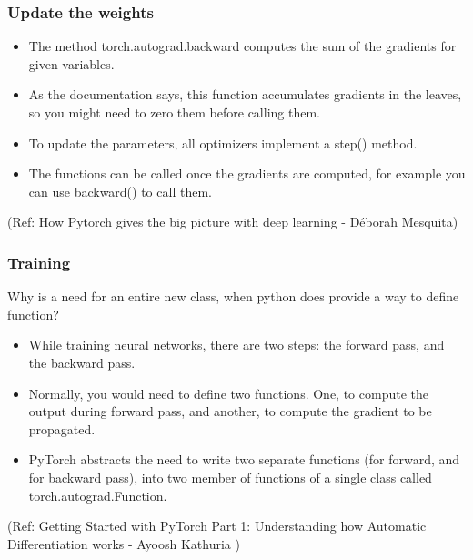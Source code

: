 \begin{frame}[fragile] \frametitle{Update the weights}
\begin{itemize}
\item The method torch.autograd.backward computes the sum of the gradients for given variables. 
\item As the documentation says, this function accumulates gradients in the leaves, so you might need to zero them before calling them. 
\item To update the parameters, all optimizers implement a step() method. 
\item The functions can be called once the gradients are computed, for example you can use backward() to call them.
\end{itemize}

  {\tiny (Ref: How Pytorch gives the big picture with deep learning - Déborah Mesquita)}
\end{frame}





\begin{frame}[fragile] \frametitle{Training}
Why is a need for an entire new class, when python does provide a way to define function?

\begin{itemize}
\item While training neural networks, there are two steps: the forward pass, and the backward pass. 
\item Normally, you would need to define two functions. One, to compute the output during forward pass, and another, to compute the gradient to be propagated.
\item PyTorch abstracts the need to write two separate functions (for forward, and for backward pass), into two member of functions of a single class called torch.autograd.Function.
\end{itemize}

{\tiny (Ref: Getting Started with PyTorch Part 1: Understanding how Automatic Differentiation works - Ayoosh Kathuria )}
\end{frame}

